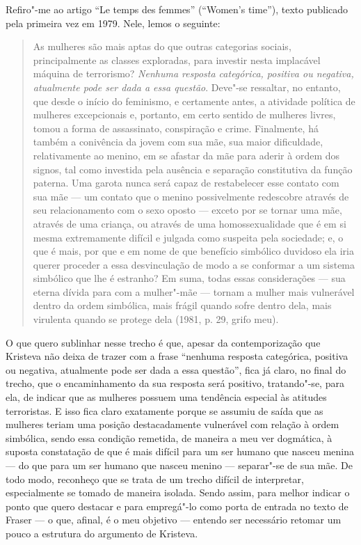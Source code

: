 Refiro"-me ao artigo ``Le temps des femmes'' (``Women's time''), texto
publicado pela primeira vez em 1979. Nele, lemos o seguinte:

\begin{quote}
As mulheres são mais aptas do que outras categorias sociais,
principalmente as classes exploradas, para investir nesta implacável
máquina de terrorismo? \emph{Nenhuma resposta categórica, positiva ou
negativa, atualmente pode ser dada a essa questão}. Deve"-se ressaltar,
no entanto, que desde o início do feminismo, e certamente antes, a
atividade política de mulheres excepcionais e, portanto, em certo
sentido de mulheres livres, tomou a forma de assassinato, conspiração e
crime. Finalmente, há também a conivência da jovem com sua mãe, sua
maior dificuldade, relativamente ao menino, em se afastar da mãe para
aderir à ordem dos signos, tal como investida pela ausência e separação
constitutiva da função paterna. Uma garota nunca será capaz de
restabelecer esse contato com sua mãe --- um contato que o menino
possivelmente redescobre através de seu relacionamento com o sexo oposto
--- exceto por se tornar uma mãe, através de uma criança, ou através de
uma homossexualidade que é em si mesma extremamente difícil e julgada
como suspeita pela sociedade; e, o que é mais, por que e em nome de que
benefício simbólico duvidoso ela iria querer proceder a essa
desvinculação de modo a se conformar a um sistema simbólico que lhe é
estranho? Em suma, todas essas considerações --- sua eterna dívida para
com a mulher"-mãe --- tornam a mulher mais vulnerável dentro da ordem
simbólica, mais frágil quando sofre dentro dela, mais virulenta quando
se protege dela (1981, p. 29, grifo meu).
\end{quote}

O que quero sublinhar nesse trecho é que, apesar da contemporização que
Kristeva não deixa de trazer com a frase ``nenhuma resposta categórica,
positiva ou negativa, atualmente pode ser dada a essa questão'', fica já
claro, no final do trecho, que o encaminhamento da sua resposta será
positivo, tratando"-se, para ela, de indicar que as mulheres possuem uma
tendência especial às atitudes terroristas. E isso fica claro exatamente
porque se assumiu de saída que as mulheres teriam uma posição
destacadamente vulnerável com relação à ordem simbólica, sendo essa
condição remetida, de maneira a meu ver dogmática, à suposta constatação
de que é mais difícil para um ser humano que nasceu menina --- do que
para um ser humano que nasceu menino --- separar"-se de sua mãe. De todo
modo, reconheço que se trata de um trecho difícil de interpretar,
especialmente se tomado de maneira isolada. Sendo assim, para melhor
indicar o ponto que quero destacar e para empregá"-lo como porta de
entrada no texto de Fraser --- o que, afinal, é o meu objetivo --- entendo
ser necessário retomar um pouco a estrutura do argumento de Kristeva.

